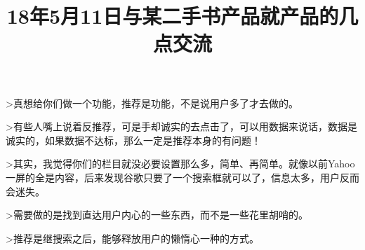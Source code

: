 \documentclass{article}
\title{18年5月11日与某二手书产品就产品的几点交流}
\begin{document}
	>真想给你们做一个功能，推荐是功能，不是说用户多了才去做的。\par
	>有些人嘴上说着反推荐，可是手却诚实的去点击了，可以用数据来说话，数据是诚实的，如果数据不达标，那么一定是推荐本身的有问题！\par
	>其实，我觉得你们的栏目就没必要设置那么多，简单、再简单。就像以前Yahoo一屏的全是内容，后来发现谷歌只要了一个搜索框就可以了，信息太多，用户反而会迷失。\par
	>需要做的是找到直达用户内心的一些东西，而不是一些花里胡哨的。\par
	>推荐是继搜索之后，能够释放用户的懒惰心一种的方式。
\end{document}
